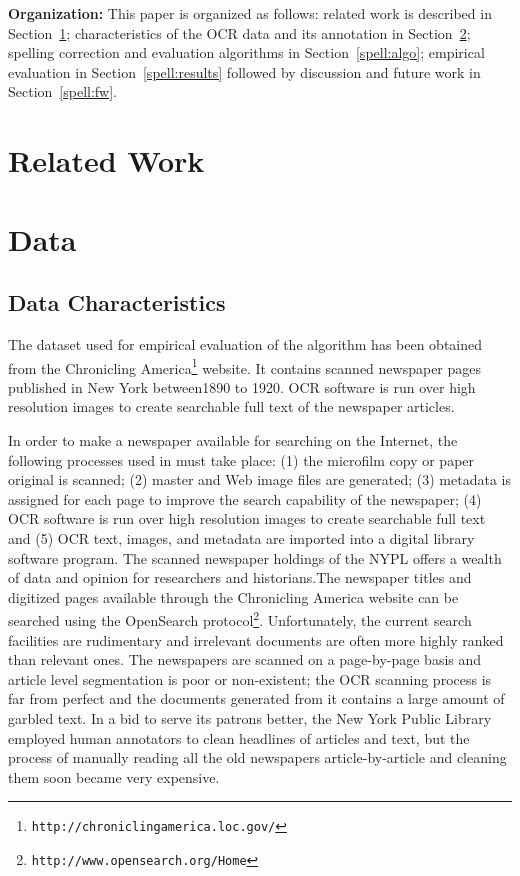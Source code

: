 \documentclass[preprint,11pt]{elsarticle}
\begin{document}
\noindent \textbf{Organization: } This paper is organized as follows: related work is described in Section~\ref{spell:rw}; characteristics of the OCR data and its annotation in Section~\ref{spell:errors}; spelling correction and evaluation algorithms in Section~\ref{spell:algo}; empirical evaluation in Section~\ref{spell:results} followed by discussion and future work in Section~\ref{spell:fw}. 

\section{Related Work}
\label{spell:rw}



\section{Data}
\label{spell:errors}

\subsection{Data Characteristics}

The dataset used for empirical evaluation of the algorithm has been obtained from the Chronicling America\footnote{\texttt{http://chroniclingamerica.loc.gov/}} website. It contains scanned newspaper pages published in New York between1890 to 1920. OCR software is run over high
resolution images to create searchable full text of the newspaper articles.

In order to make a newspaper available for searching on the Internet,
the following processes used in \cite{dutta2011learning} must take place: (1) the microfilm copy or
paper original is scanned; (2) master and Web image files are
generated; (3) metadata is assigned for each page to improve the
search capability of the newspaper; (4) OCR software is run over high
resolution images to create searchable full text and (5) OCR text,
images, and metadata are imported into a digital library software
program. 
The scanned newspaper holdings of the NYPL offers a wealth of
data and opinion for researchers and historians.The newspaper titles and digitized pages available through the
Chronicling America website can be searched using the OpenSearch
protocol\footnote{\texttt{http://www.opensearch.org/Home}}.
Unfortunately, the current search facilities are rudimentary and
irrelevant documents are often more highly ranked than relevant ones.
The newspapers are scanned on a page-by-page basis and article level
segmentation is poor or non-existent; the OCR scanning process is far
from perfect and the documents generated from it contains a large
amount of garbled text. In a bid to serve its patrons better, the New
York Public Library employed human annotators to clean headlines of
articles and text, but the process of manually reading all the old
newspapers article-by-article and cleaning them soon became very
expensive.
\end{document}

